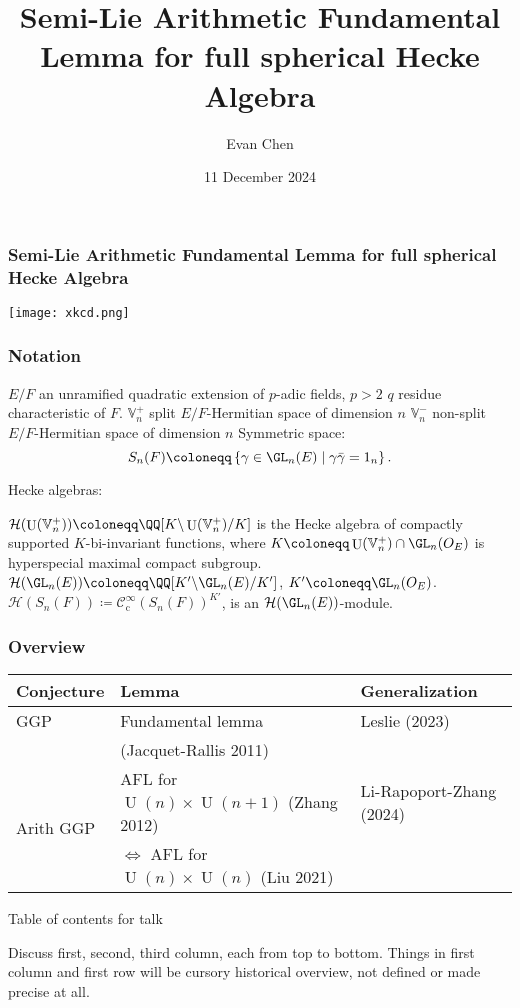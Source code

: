\documentclass[11pt]{beamer}
\title[Semi-Lie AFL for full Hecke algebra]{Semi-Lie Arithmetic Fundamental Lemma for full spherical Hecke Algebra}
\institute{Mass Tech}
\author{Evan Chen}
\date{11 December 2024}
\DeclareMathOperator{\U}{U}
\newcommand{\HH}{\mathcal{H}}
\newcommand{\VV}{\mathbb{V}}
\renewcommand{\OO}{O}
\begin{document}
\begin{frame}
  \frametitle{Semi-Lie Arithmetic Fundamental Lemma for full spherical Hecke Algebra}
  \begin{center}
    \texttt{[image: xkcd.png]}
  \end{center}
\end{frame}

\begin{frame}
  \maketitle
\end{frame}

\begin{frame}
  \frametitle{Notation}
  \begin{itemize}
  \ii $E/F$ an unramified quadratic extension of $p$-adic fields, $p > 2$
  \ii $q$ residue characteristic of $F$.
  \ii $\VV_n^+$ split $E/F$-Hermitian space of dimension $n$
  \ii $\VV_n^-$ non-split $E/F$-Hermitian space of dimension $n$
  \ii Symmetric space:
  \[ S_n(F) \coloneqq \left\{ \gamma \in \GL_n(E) \mid \gamma\bar\gamma = 1_n \right\} . \]
  \end{itemize}
  Hecke algebras:
  \begin{itemize}
  \ii $\HH(\U(\VV_n^+)) \coloneqq \QQ[K \backslash \U(\VV_n^+) \slash K]$
  is the Hecke algebra of compactly supported $K$-bi-invariant functions,
  where $K \coloneqq \U(\VV_n^+) \cap \GL_n(\OO_E)$ is hyperspecial maximal compact subgroup.
  \ii $\HH(\GL_n(E)) \coloneqq \QQ[K' \backslash \GL_n(E) \slash K']$, $K' \coloneqq \GL_n(\OO_E)$.
  \ii $\HH(S_n(F)) \coloneqq \mathcal C^\infty_{\text{c}} (S_n(F))^{K'}$,
  is an $\HH(\GL_n(E))$-module.
  \end{itemize}
\end{frame}


\begin{frame}
  \frametitle{Overview}
  \centering
  \begin{tabular}{lp{12em}p{8em}}
    \toprule
    \textbf{Conjecture} & \textbf{Lemma} & \textbf{Generalization} \\
    \midrule
    GGP & Fundamental lemma & Leslie (2023) \\ & (Jacquet-Rallis 2011) \\
    \midrule
    \multirow{2}{*}[-1em]{Arith GGP} & AFL for $\U(n) \times \U(n+1)$ (Zhang 2012) & Li-Rapoport-Zhang (2024) \\ \cline{2-3}
    & $\iff$ AFL for $\U(n) \times \U(n)$ (Liu 2021) & 🤔 \\
    \bottomrule
  \end{tabular}
  \begin{block}{Table of contents for talk}
    \begin{itemize}
    \ii Discuss first, second, third column, each from top to bottom.
    \ii Things in first column and first row will be cursory historical overview,
      not defined or made precise at all.
    \end{itemize}
  \end{block}
\end{frame}
\end{document}
